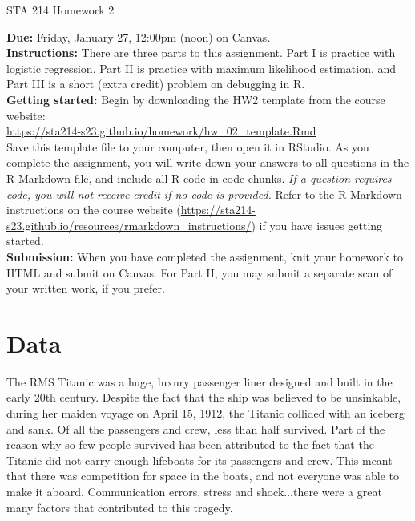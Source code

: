 \documentclass[11pt]{article}
\begin{document}
\begin{center}
\Large
STA 214 Homework 2\\
\normalsize
\vspace{5mm}
\end{center}

\noindent \textbf{Due:} Friday, January 27, 12:00pm (noon) on Canvas.\\ 

\noindent \textbf{Instructions:} There are three parts to this assignment. Part I is practice with logistic regression, Part II is practice with maximum likelihood estimation, and Part III is a short (extra credit) problem on debugging in R.\\

\noindent \textbf{Getting started:} Begin by downloading the HW2 template from the course website:\\

\url{https://sta214-s23.github.io/homework/hw_02_template.Rmd}\\

\noindent Save this template file to your computer, then open it in RStudio. As you complete the assignment, you will write down your answers to all questions in the R Markdown file, and include all R code in code chunks. \textit{If a question requires code, you will not receive credit if no code is provided.} Refer to the R Markdown instructions on the course website (\url{https://sta214-s23.github.io/resources/rmarkdown_instructions/}) if you have issues getting started.\\

\noindent \textbf{Submission:} When you have completed the assignment, knit your homework to HTML and submit on Canvas. For Part II, you may submit a separate scan of your written work, if you prefer.

\section*{Data}

The RMS Titanic was a huge, luxury passenger liner designed and built in the early 20th century. Despite the fact that the ship was believed to be unsinkable, during her maiden voyage on April 15, 1912, the Titanic collided with an iceberg and sank. Of all the passengers and crew, less than half survived. Part of the reason why so few people survived has been attributed to the fact that the Titanic did not carry enough lifeboats for its passengers and crew. This meant that there was competition for space in the boats, and not everyone was able to make it aboard. Communication errors, stress and shock...there were a great many factors that contributed to this tragedy.\\
\end{document}
